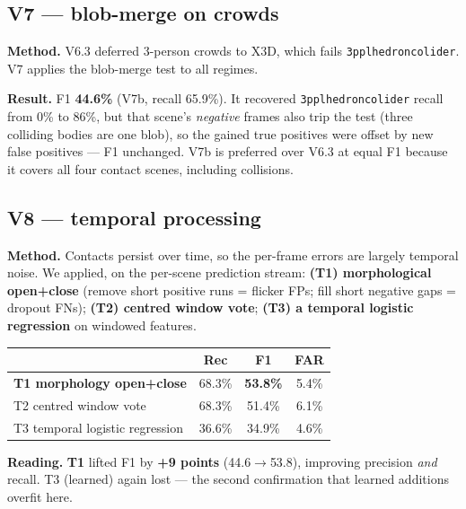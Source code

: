 \documentclass[11pt, a4paper]{article}
\begin{document}
\subsection{V7 --- blob-merge on crowds}
\label{sec:v7}
\textbf{Method.} V6.3 deferred 3-person crowds to X3D, which fails
\texttt{3pplhedroncolider}. V7 applies the blob-merge test to all regimes.

\textbf{Result.} F1 \textbf{44.6\%} (V7b, recall 65.9\%). It recovered
\texttt{3pplhedroncolider} recall from 0\% to 86\%, but that scene's
\emph{negative} frames also trip the test (three colliding bodies are one blob),
so the gained true positives were offset by new false positives --- F1 unchanged.
V7b is preferred over V6.3 at equal F1 because it covers all four contact scenes,
including collisions.

\subsection{V8 --- temporal processing}
\label{sec:v8}
\textbf{Method.} Contacts persist over time, so the per-frame errors are largely
temporal noise. We applied, on the per-scene prediction stream:
\textbf{(T1) morphological open+close} (remove short positive runs = flicker FPs;
fill short negative gaps = dropout FNs); \textbf{(T2) centred window vote};
\textbf{(T3) a temporal logistic regression} on windowed features.

\begin{center}\renewcommand{\arraystretch}{1.15}
\begin{tabular}{l c c c}
\toprule
& \textbf{Rec} & \textbf{F1} & \textbf{FAR} \\
\midrule
\textbf{T1 morphology open+close} & 68.3\% & \textbf{53.8\%} & 5.4\% \\
T2 centred window vote            & 68.3\% & 51.4\% & 6.1\% \\
T3 temporal logistic regression   & 36.6\% & 34.9\% & 4.6\% \\
\bottomrule
\end{tabular}\end{center}

\textbf{Reading.} \textbf{T1} lifted F1 by \textbf{+9 points} (44.6$\to$53.8),
improving precision \emph{and} recall. T3 (learned) again lost --- the second
confirmation that learned additions overfit here.

\end{document}
